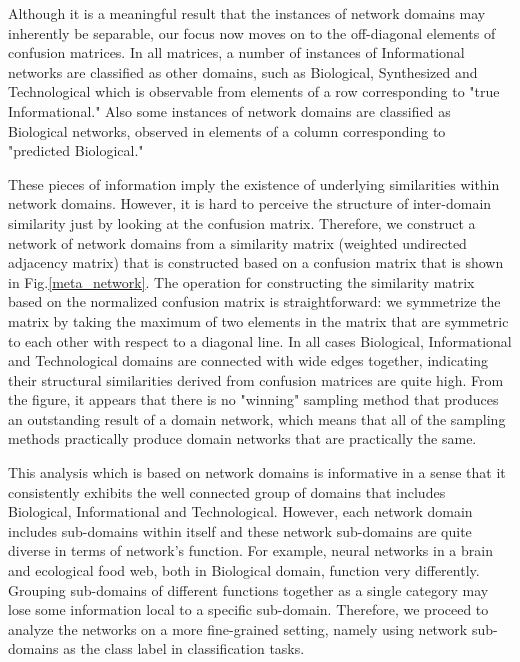Although it is a meaningful result that the instances of network domains may inherently be separable, our focus now moves on to the off-diagonal elements of confusion matrices. In all matrices, a number of instances of Informational networks are classified as other domains, such as Biological, Synthesized and Technological which is observable from elements of a row corresponding to  "true Informational." Also some instances of network domains are classified as Biological networks, observed in elements of a column corresponding to "predicted Biological." 

These pieces of information imply the existence of underlying similarities within network domains. However, it is hard to perceive the structure of inter-domain similarity just by looking at the confusion matrix. Therefore, we construct a network of network domains from a similarity matrix (weighted undirected adjacency matrix) that is constructed based on a confusion matrix that is shown in Fig.\ref{meta_network}. The operation for constructing the similarity matrix based on the normalized confusion matrix is straightforward: we symmetrize the matrix by taking the maximum of two elements in the matrix that are symmetric to each other with respect to a diagonal line. In all cases Biological, Informational and Technological domains are connected with wide edges together, indicating their structural similarities derived from confusion matrices are quite high. From the figure, it appears that there is no "winning" sampling method that produces an outstanding result of a domain network, which means that all of the sampling methods practically produce domain networks that are practically the same.


This analysis which is based on network domains is informative in a sense that it consistently exhibits the well connected group of domains that includes Biological, Informational and Technological. However, each network domain includes sub-domains within itself and these network sub-domains are quite diverse in terms of network's function. For example, neural networks in a brain and ecological food web, both in Biological domain, function very differently. Grouping sub-domains of different functions together as a single category may lose some information local to a specific sub-domain. Therefore, we proceed to analyze the networks on a more fine-grained setting, namely using network sub-domains as the class label in classification tasks.
 

